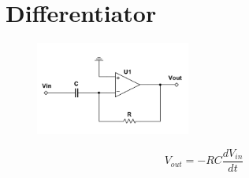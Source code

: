 \section{Differentiator}
\begin{figure}[H]
	\centering
	\includegraphics[width=2in]{opamps/differentiator.png}
	\label{fig:fig}
\end{figure}
\[V_{out} = -RC\frac{dV_{in}}{dt} \]

